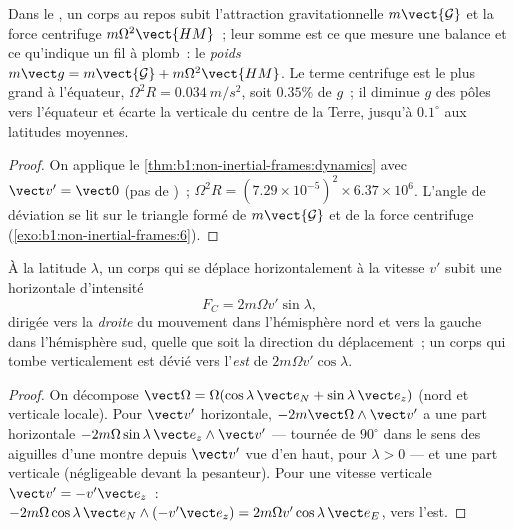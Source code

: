\begin{proposition}\label{prop:b1:non-inertial-frames:weight}
Dans le , un corps au repos subit l'attraction
gravitationnelle $m\vect{\mathcal G}$ et la force centrifuge
$m\Omega^2\vect{HM}$~; leur somme est ce que mesure une balance et ce
qu'indique un fil à plomb~: le \emph{poids}
$m\vect g = m\vect{\mathcal G} + m\Omega^2\vect{HM}$. Le terme centrifuge
est le plus grand à l'équateur, $\Omega^2R = \qty{0.034}{m/s^2}$, soit
$0.35\%$ de $g$~; il diminue $g$ des pôles vers l'équateur et écarte la
verticale du centre de la Terre, jusqu'à $0.1^\circ$ aux latitudes moyennes.
\end{proposition}

\begin{proof}
On applique le \cref{thm:b1:non-inertial-frames:dynamics} avec $\vect v' = \vect 0$
(pas de )~; $\Omega^2R = (7.29\times10^{-5})^2 \times 6.37\times10^6$.
L'angle de déviation se lit sur le triangle formé de $m\vect{\mathcal G}$ et de
la force centrifuge (\cref{exo:b1:non-inertial-frames:6}).
\end{proof}

\begin{proposition}\label{prop:b1:non-inertial-frames:coriolis}
À la latitude $\lambda$, un corps qui se déplace horizontalement à la
vitesse $v'$ subit une  horizontale d'intensité
\[
F_C = 2m\Omega v'\sin\lambda ,
\]
dirigée vers la \emph{droite} du mouvement dans l'hémisphère nord et
vers la gauche dans l'hémisphère sud, quelle que soit la direction du
déplacement~; un corps qui tombe verticalement est dévié vers l'\emph{est}
de $2m\Omega v'\cos\lambda$.
\end{proposition}

\begin{proof}
On décompose $\vect\Omega = \Omega(\cos\lambda\,\vect e_N + \sin\lambda\,\vect e_z)$
(nord et verticale locale). Pour $\vect v'$ horizontale, $-2m\vect\Omega\wedge\vect v'$
a une part horizontale $-2m\Omega\sin\lambda\,\vect e_z\wedge\vect v'$ ---
tournée de $90^\circ$ dans le sens des aiguilles d'une montre depuis
$\vect v'$ vue d'en haut, pour $\lambda > 0$ --- et une part verticale
(négligeable devant la pesanteur). Pour une vitesse verticale $\vect v' =
-v'\vect e_z$~: $-2m\Omega\cos\lambda\,\vect e_N\wedge(-v'\vect e_z) = 2m\Omega v'\cos\lambda\,
\vect e_E$, vers l'est.
\end{proof}

